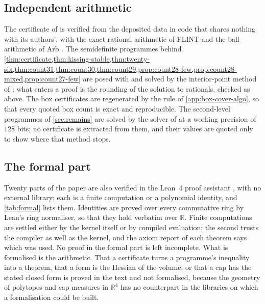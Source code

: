 \documentclass[11pt,reqno]{amsart}
\renewcommand{\_}{\origunderscore\allowbreak}
\numberwithin{equation}{section}
\theoremstyle{plain}
\theoremstyle{definition}
\theoremstyle{remark}
\begin{document}
\subsection{Independent arithmetic}

The certificate of \cite{LLM24} is verified from the deposited data
\cite{LLM24data} in code that shares nothing with its authors', with the
exact rational arithmetic of FLINT and the ball arithmetic of Arb
\cite{Joh17}. The semidefinite programmes behind
\cref{thm:certificate,thm:kissing-stable,thm:twenty-six,thm:count31,thm:count30,thm:count29,prop:count28-few,prop:count28-mixed,prop:count27-few} are posed
with \cite{DB16} and solved by the interior-point method of \cite{GC26};
what enters a proof is the rounding of the solution to rationals, checked
as above. The box certificates are regenerated by the rule of
\cref{app:box-cover-algo}, so that every quoted box count is exact and
reproducible. The second-level programmes of \cref{sec:remains} are
solved by the solver of \cite{LdL24} at a working precision of $128$ bits;
no certificate is extracted from them, and their values are quoted only to
show where that method stops.

\subsection{The formal part}\label{sec:formal-part}

Twenty parts of the paper are also verified in the Lean~4 proof
assistant \cite{MU21}, with no external library; each is a finite
computation or a polynomial identity, and \cref{tab:formal} lists them.
Identities are proved over every commutative ring by Lean's ring
normaliser, so that they hold verbatim over $\mathbb{R}$. Finite
computations are settled either by the kernel itself or by compiled
evaluation; the second trusts the compiler as well as the kernel, and the
axiom report of each theorem says which was used. No proof in the formal
part is left incomplete. What is formalised is the arithmetic. That a
certificate turns a programme's inequality into a theorem, that a form is
the Hessian of the volume, or that a cap has the stated closed form is
proved in the text and not formalised, because the geometry of polytopes
and cap measures in $\mathbb{R}^4$ has no counterpart in the libraries on
which a formalisation could be built.
\end{document}
